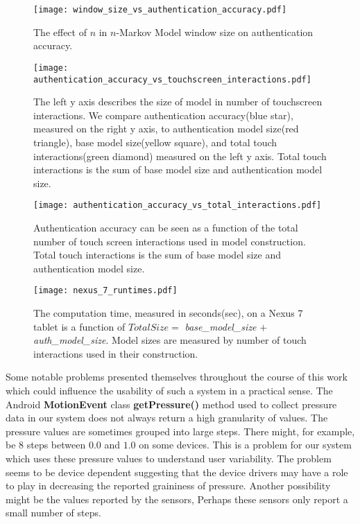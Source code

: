 \begin{figure}
\centering
\texttt{[image: window\_size\_vs\_authentication\_accuracy.pdf]}
\caption{The effect of $n$ in $n$-Markov Model window size on authentication accuracy.}
\label{fig:window_size_vs_authentication_accuracy}
\end{figure}

\begin{figure}
\centering
\texttt{[image: authentication\_accuracy\_vs\_touchscreen\_interactions.pdf]}
\caption{
The left y axis describes the size of model
in number of touchscreen interactions.
We compare
authentication accuracy(blue star), measured on the right y axis, 
to authentication model size(red triangle),
base model size(yellow square),
and total touch interactions(green diamond)
measured on the left y axis.
Total touch interactions is the sum of
base model size and authentication model size.
}
\label{fig:authentication_accuracy}
\end{figure}

\begin{figure}
\centering
\texttt{[image: authentication\_accuracy\_vs\_total\_interactions.pdf]}
\caption{
Authentication accuracy can be seen as
a function of
the total number of touch screen interactions
used in model construction.
Total touch interactions is the sum of
base model size and authentication model size.
}
\label{fig:total_touches_vs_authentication_accuracy}
\end{figure}

\begin{figure}
\centering
\texttt{[image: nexus\_7\_runtimes.pdf]}
\caption{
The computation time, measured in seconds(sec), on a Nexus 7 tablet is
a function of
$Total Size =$ {\it base\_model\_size} $+$ {\it auth\_model\_size}.
Model sizes are measured by number of touch interactions used in their construction.
}
\label{fig:nexus_total_size_time}
\end{figure}


Some notable problems presented themselves
throughout the course of this work
which could influence the usability of such a 
system in a practical sense.
%
The Android \textbf{MotionEvent} class \textbf{getPressure()} method
used to collect pressure data in our system
does not always return a high granularity of values.
The pressure values are sometimes grouped
into large steps.
There might, for example,
be $8$ steps between $0.0$ and $1.0$ on some devices.
This is a problem for our system which uses
these pressure values to understand user variability.
%
The problem seems to be device dependent
suggesting that the device drivers may have a role to play
in decreasing the reported graininess of pressure.
Another possibility might be the values
reported by the sensors,
Perhaps these sensors only report a small number of steps.

